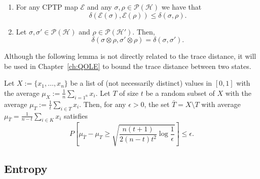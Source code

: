 
\begin{lemma}

\begin{enumerate}

    The trace distance has the following properties:

    \item For any CPTP map $\mathcal{E}$ and any $\sigma, \rho \in \mathcal{P}(\mathcal{H})$ we have that
    $$\delta(\mathcal{E}(\sigma), \mathcal{E}(\rho)) \leq \delta(\sigma, \rho).$$
    
    \item Let $\sigma, \sigma' \in \mathcal{P}(\mathcal{H})$ and $\rho \in \mathcal{P}(\mathcal{H}')$. Then,
    $$\delta(\sigma\otimes \rho, \sigma'\otimes \rho) = \delta(\sigma, \sigma').$$
\end{enumerate}

\label{lemma:trace_distance}
\end{lemma}

Although the following lemma is not directly related to the trace distance, it will be used in Chapter~\ref{ch:QOLE} to bound the trace distance between two states.

\begin{lemma}
Let $X:=\{x_1, \ldots, x_n\}$ be a list of (not necessarily distinct) values in $[0,1]$ with the average $\mu_X:=\frac{1}{n}\sum_{i=1^n} x_i$. Let $T$ of size $t$ be a random subset of $X$ with the average $\mu_T := \frac{1}{t}\sum_{i\in T} x_i$. Then, for any $\epsilon > 0$, the set $\bar{T} = X\setminus T$ with average $\mu_{\bar{T}} = \frac{1}{n-t}\sum_{i\in K} x_i$ satisfies
$$P\left[ \mu_{\bar{T}} - \mu_T \geq \sqrt{\frac{n(t+1)}{2(n-t)t^2} \log \frac{1}{\epsilon}}  \right] \leq \epsilon.$$
\label{lemma:trace_distance_bound}
\end{lemma}


\subsection{Entropy}

